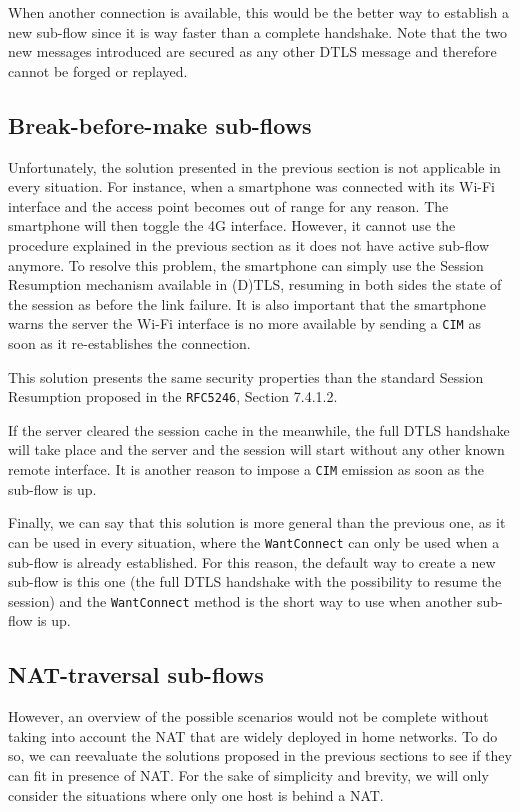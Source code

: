 When another connection is available, this would be the better way to establish a new sub-flow since it is way faster than a complete handshake. Note that the two new messages introduced are secured as any other DTLS message and therefore cannot be forged or replayed.


\subsection{Break-before-make sub-flows}
Unfortunately, the solution presented in the previous section is not applicable in every situation. For instance, when a smartphone was connected with its Wi-Fi interface and the access point becomes out of range for any reason. The smartphone will then toggle the 4G interface. However, it cannot use the procedure explained in the previous section as it does not have active sub-flow anymore. To resolve this problem, the smartphone can simply use the Session Resumption mechanism available in (D)TLS, resuming in both sides the state of the session as before the link failure. It is also important that the smartphone warns the server the Wi-Fi interface is no more available by sending a \verb!CIM! as soon as it re-establishes the connection.

This solution presents the same security properties than the standard Session Resumption proposed in the \verb!RFC5246!\cite{rfc5246}, Section 7.4.1.2.

If the server cleared the session cache in the meanwhile, the full DTLS handshake will take place and the server and the session will start without any other known remote interface. It is another reason to impose a \verb!CIM! emission as soon as the sub-flow is up.

Finally, we can say that this solution is more general than the previous one, as it can be used in every situation, where the \verb!WantConnect! can only be used when a sub-flow is already established. For this reason, the default way to create a new sub-flow is this one (the full DTLS handshake with the possibility to resume the session) and the \verb!WantConnect! method is the short way to use when another sub-flow is up.

\subsection{NAT-traversal sub-flows}

However, an overview of the possible scenarios would not be complete without taking into account the NAT that are widely deployed in home networks. To do so, we can reevaluate the solutions proposed in the previous sections to see if they can fit in presence of NAT. For the sake of simplicity and brevity, we will only consider the situations where only one host is behind a NAT.

